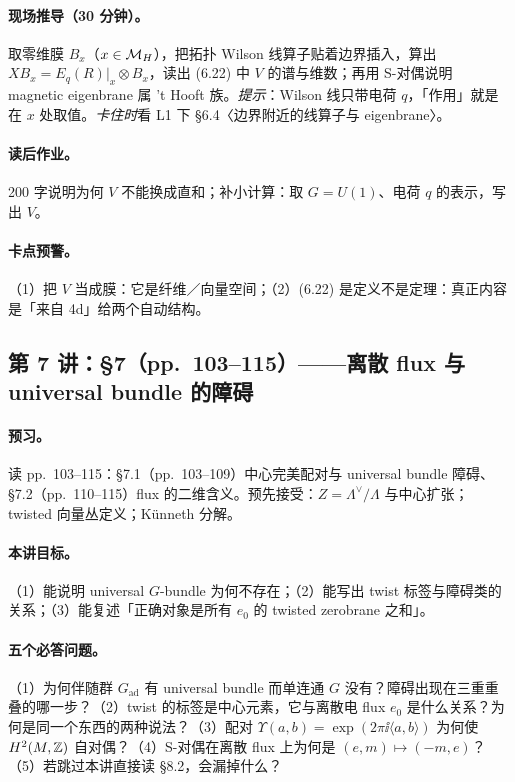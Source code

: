{\paragraph{现场推导（30 分钟）。}取零维膜 \(B_x\)（\(x\in\mathcal{M}_H\)），把拓扑 Wilson 线算子贴着边界插入，算出 \(XB_x=E_q(R)|_x\otimes B_x\)，读出 (6.22) 中 \(V\) 的谱与维数；再用 S-对偶说明 magnetic eigenbrane 属 't Hooft 族。\emph{提示}：Wilson 线只带电荷 \(q\)，「作用」就是在 \(x\) 处取值。\emph{卡住时}看 L1 下 §6.4〈边界附近的线算子与 eigenbrane〉。\pC

\paragraph{读后作业。}200 字说明为何 \(V\) 不能换成直和；补小计算：取 \(G=U(1)\)、电荷 \(q\) 的表示，写出 \(V\)。\pC

\paragraph{卡点预警。}（1）把 \(V\) 当成膜：它是纤维／向量空间；（2）(6.22) 是定义不是定理：真正内容是「来自 4d」给两个自动结构。\pC

\subsection{第 7 讲：\S7（pp.~103--115）——离散 flux 与 universal bundle 的障碍}

\paragraph{预习。}读 pp.~103--115：§7.1（pp.~103--109）中心完美配对与 universal bundle 障碍、§7.2（pp.~110--115）flux 的二维含义。预先接受：\(Z=\Lambda^\vee/\Lambda\) 与中心扩张；twisted 向量丛定义；Künneth 分解。\pC

\paragraph{本讲目标。}（1）能说明 universal \(G\)-bundle 为何不存在；（2）能写出 twist 标签与障碍类的关系；（3）能复述「正确对象是所有 \(e_0\) 的 twisted zerobrane 之和」。\pC

\paragraph{五个必答问题。}（1）为何伴随群 \(G_{\mathrm{ad}}\) 有 universal bundle 而单连通 \(G\) 没有？障碍出现在三重重叠的哪一步？（2）twist 的标签是中心元素，它与离散电 flux \(e_0\) 是什么关系？为何是同一个东西的两种说法？（3）配对 \(\Upsilon(a,b)=\exp(2\pi\ii\langle a,b\rangle)\) 为何使 \(H^{2}(M,\mathbb{Z})\) 自对偶？（4）S-对偶在离散 flux 上为何是 \((e,m)\mapsto(-m,e)\)？（5）若跳过本讲直接读 §8.2，会漏掉什么？\pC

}
